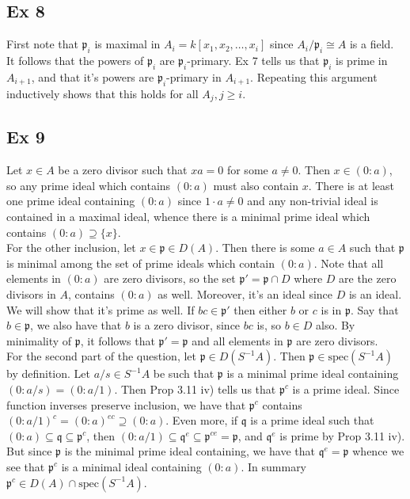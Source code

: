 \documentclass{article}
\theoremstyle{definition}
\newcommand{\spec}{\text{spec}}
\begin{document}
\subsection*{Ex 8}

First note that $\mathfrak{p}_i$ is maximal in $A_i = k[x_1, x_2, \ldots, x_i]$
since $A_i/\mathfrak{p}_i \cong A$ is a field. It follows that the powers of
$\mathfrak{p}_i$ are $\mathfrak{p}_i$-primary. Ex 7 tells us that
$\mathfrak{p}_i$ is prime in $A_{i + 1}$, and that it's powers are
$\mathfrak{p}_i$-primary in $A_{i + 1}$. Repeating this argument inductively
shows that this holds for all $A_j, j \geq i$.

\subsection*{Ex 9}

Let $x \in A$ be a zero divisor such that $xa = 0$ for some $a \not = 0$. Then
$x \in (0:a)$, so any prime ideal which contains $(0:a)$ must also contain $x$.
There is at least one prime ideal containing $(0:a)$ since $1 \cdot a \not = 0$
and any non-trivial ideal is contained in a maximal ideal, whence there is a
minimal prime ideal which contains $(0:a) \supseteq \{x\}$. \\

For the other inclusion, let $x \in \mathfrak{p} \in D(A)$. Then there is some
$a \in A$ such that $\mathfrak{p}$ is minimal among the set of prime ideals
which contain $(0:a)$. Note that all elements in $(0:a)$ are zero divisors, so
the set $\mathfrak{p}' = \mathfrak{p} \cap D$ where $D$ are the zero divisors
in $A$, contains $(0:a)$ as well. Moreover, it's an ideal since $D$ is an
ideal. We will show that it's prime as well. If $bc \in \mathfrak{p}'$ then
either $b$ or $c$ is in $\mathfrak{p}$. Say that $b \in \mathfrak{p}$, we also
have that $b$ is a zero divisor, since $bc$ is, so $b \in D$ also. By
minimality of $\mathfrak{p}$, it follows that $\mathfrak{p'} = \mathfrak{p}$
and all elements in $\mathfrak{p}$ are zero divisors. \\

For the second part of the question, let $\mathfrak{p} \in D(S^{-1}A)$. Then
$\mathfrak{p} \in \spec(S^{-1}A)$ by definition. Let $a/s \in S^{-1}A$ be such
that $\mathfrak{p}$ is a minimal prime ideal containing $(0:a/s) = (0:a/1)$.
Then Prop 3.11 iv) tells us that $\mathfrak{p}^{c}$ is a prime ideal. Since
function inverses preserve inclusion, we have that $\mathfrak{p}^{c}$ contains
$(0:a/1)^{c} = (0:a)^{ec} \supseteq (0:a)$. Even more, if $\mathfrak{q}$ is a
prime ideal such that $(0:a) \subseteq \mathfrak{q} \subseteq
\mathfrak{p}^{c}$, then $(0:a/1) \subseteq \mathfrak{q}^{e} \subseteq
\mathfrak{p}^{ce} = \mathfrak{p}$, and $\mathfrak{q}^{e}$ is prime by Prop 3.11
iv). But since $\mathfrak{p}$ is the minimal prime ideal containing, we have
that $\mathfrak{q}^{e} = \mathfrak{p}$ whence we see that $\mathfrak{p}^{c}$ is
a minimal ideal containing $(0:a)$. In summary $\mathfrak{p}^{c} \in D(A) \cap
\spec(S^{-1}A)$. \\
\end{document}
